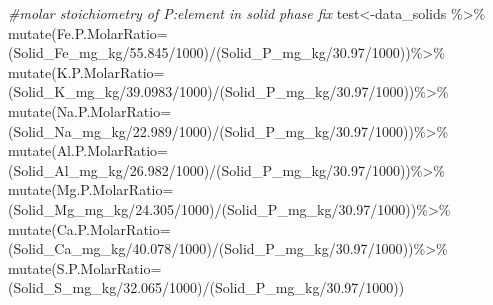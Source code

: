 \documentclass[
]{article}
\newenvironment{Shaded}{\begin{snugshade}}{\end{snugshade}}
\newcommand{\AttributeTok}[1]{\textcolor[rgb]{0.77,0.63,0.00}{#1}}
\newcommand{\CommentTok}[1]{\textcolor[rgb]{0.56,0.35,0.01}{\textit{#1}}}
\newcommand{\DecValTok}[1]{\textcolor[rgb]{0.00,0.00,0.81}{#1}}
\newcommand{\FloatTok}[1]{\textcolor[rgb]{0.00,0.00,0.81}{#1}}
\newcommand{\FunctionTok}[1]{\textcolor[rgb]{0.00,0.00,0.00}{#1}}
\newcommand{\NormalTok}[1]{#1}
\newcommand{\OtherTok}[1]{\textcolor[rgb]{0.56,0.35,0.01}{#1}}
\newcommand{\SpecialCharTok}[1]{\textcolor[rgb]{0.00,0.00,0.00}{#1}}
\begin{document}
\begin{Shaded}
\begin{Highlighting}[]
\CommentTok{\#molar stoichiometry of P:element in solid phase fix}
\NormalTok{test}\OtherTok{\textless{}{-}}\NormalTok{data\_solids }\SpecialCharTok{\%\textgreater{}\%}
  \FunctionTok{mutate}\NormalTok{(}\AttributeTok{Fe.P.MolarRatio=}\NormalTok{(Solid\_Fe\_mg\_kg}\SpecialCharTok{/}\FloatTok{55.845}\SpecialCharTok{/}\DecValTok{1000}\NormalTok{)}\SpecialCharTok{/}\NormalTok{(Solid\_P\_mg\_kg}\SpecialCharTok{/}\FloatTok{30.97}\SpecialCharTok{/}\DecValTok{1000}\NormalTok{))}\SpecialCharTok{\%\textgreater{}\%}
  \FunctionTok{mutate}\NormalTok{(}\AttributeTok{K.P.MolarRatio=}\NormalTok{(Solid\_K\_mg\_kg}\SpecialCharTok{/}\FloatTok{39.0983}\SpecialCharTok{/}\DecValTok{1000}\NormalTok{)}\SpecialCharTok{/}\NormalTok{(Solid\_P\_mg\_kg}\SpecialCharTok{/}\FloatTok{30.97}\SpecialCharTok{/}\DecValTok{1000}\NormalTok{))}\SpecialCharTok{\%\textgreater{}\%}
  \FunctionTok{mutate}\NormalTok{(}\AttributeTok{Na.P.MolarRatio=}\NormalTok{(Solid\_Na\_mg\_kg}\SpecialCharTok{/}\FloatTok{22.989}\SpecialCharTok{/}\DecValTok{1000}\NormalTok{)}\SpecialCharTok{/}\NormalTok{(Solid\_P\_mg\_kg}\SpecialCharTok{/}\FloatTok{30.97}\SpecialCharTok{/}\DecValTok{1000}\NormalTok{))}\SpecialCharTok{\%\textgreater{}\%}
  \FunctionTok{mutate}\NormalTok{(}\AttributeTok{Al.P.MolarRatio=}\NormalTok{(Solid\_Al\_mg\_kg}\SpecialCharTok{/}\FloatTok{26.982}\SpecialCharTok{/}\DecValTok{1000}\NormalTok{)}\SpecialCharTok{/}\NormalTok{(Solid\_P\_mg\_kg}\SpecialCharTok{/}\FloatTok{30.97}\SpecialCharTok{/}\DecValTok{1000}\NormalTok{))}\SpecialCharTok{\%\textgreater{}\%}
  \FunctionTok{mutate}\NormalTok{(}\AttributeTok{Mg.P.MolarRatio=}\NormalTok{(Solid\_Mg\_mg\_kg}\SpecialCharTok{/}\FloatTok{24.305}\SpecialCharTok{/}\DecValTok{1000}\NormalTok{)}\SpecialCharTok{/}\NormalTok{(Solid\_P\_mg\_kg}\SpecialCharTok{/}\FloatTok{30.97}\SpecialCharTok{/}\DecValTok{1000}\NormalTok{))}\SpecialCharTok{\%\textgreater{}\%}
  \FunctionTok{mutate}\NormalTok{(}\AttributeTok{Ca.P.MolarRatio=}\NormalTok{(Solid\_Ca\_mg\_kg}\SpecialCharTok{/}\FloatTok{40.078}\SpecialCharTok{/}\DecValTok{1000}\NormalTok{)}\SpecialCharTok{/}\NormalTok{(Solid\_P\_mg\_kg}\SpecialCharTok{/}\FloatTok{30.97}\SpecialCharTok{/}\DecValTok{1000}\NormalTok{))}\SpecialCharTok{\%\textgreater{}\%}
  \FunctionTok{mutate}\NormalTok{(}\AttributeTok{S.P.MolarRatio=}\NormalTok{(Solid\_S\_mg\_kg}\SpecialCharTok{/}\FloatTok{32.065}\SpecialCharTok{/}\DecValTok{1000}\NormalTok{)}\SpecialCharTok{/}\NormalTok{(Solid\_P\_mg\_kg}\SpecialCharTok{/}\FloatTok{30.97}\SpecialCharTok{/}\DecValTok{1000}\NormalTok{))}




\end{Highlighting}
\end{Shaded}
\end{document}
